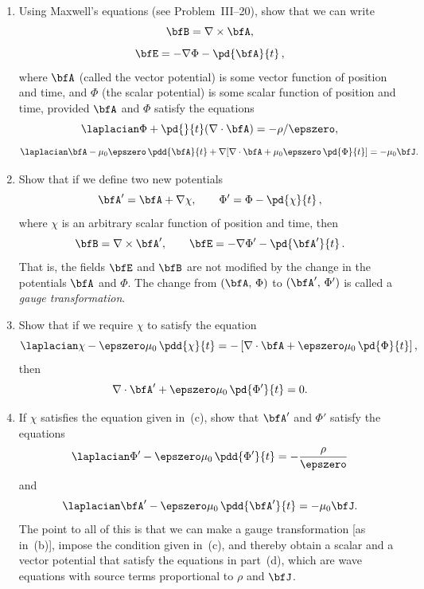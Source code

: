 \begin{problems}
\prob
\begin{enumerate}[label=(\alph*)]
\item Using Maxwell's equations (see Problem~III--20), show that we
  can write
  \[
  \bfB = \nabla\times\bfA,
  \]
  \[
  \bfE = -\nabla\Phi - \pd{\bfA}{t}\,,
  \]
  where $\bfA$ (called the vector potential) is some vector function of
  position and time, and $\Phi$ (the scalar potential) is some scalar
  function of position and time, provided $\bfA$ and $\Phi$ satisfy
  the equations
  \[
  \laplacian\Phi + \pd{}{t}(\nabla\cdot\bfA)
  = -\rho/\epszero,
  \]
  \[
  \laplacian\bfA - \mu_0\epszero\,\pdd{\bfA}{t}
  + \nabla\!\left[\nabla\cdot\bfA
    + \mu_0\epszero\,\pd{\Phi}{t}\right]
  = -\mu_0\bfJ.
  \]

\item Show that if we define two new potentials
  \[
  \bfA' = \bfA + \nabla\chi,\qquad
  \Phi' = \Phi - \pd{\chi}{t}\,,
  \]
  where $\chi$ is an arbitrary scalar function of position and time,
  then
  \[
  \bfB = \nabla\times\bfA',\qquad
  \bfE = -\nabla\Phi' - \pd{\bfA'}{t}\,.
  \]
  That is, the fields $\bfE$ and $\bfB$ are not modified by the change
  in the potentials $\bfA$ and $\Phi$.  The change from
  $(\bfA,\,\Phi)$ to $(\bfA',\,\Phi')$ is called a \emph{gauge
  transformation}.

\item Show that if we require $\chi$ to satisfy the equation
  \[
  \laplacian\chi - \epszero\mu_0\,\pdd{\chi}{t}
  = -\left[\nabla\cdot\bfA
    + \epszero\mu_0\,\pd{\Phi}{t}\right],
  \]
  then
  \[
  \nabla\cdot\bfA' + \epszero\mu_0\,\pd{\Phi'}{t} = 0.
  \]

\item If $\chi$ satisfies the equation given in~(c), show that $\bfA'$
  and $\Phi'$ satisfy the equations
  \[
  \laplacian\Phi' - \epszero\mu_0\,\pdd{\Phi'}{t}
  = -\frac{\rho}{\epszero}
  \]
  and
  \[
  \laplacian\bfA' - \epszero\mu_0\,\pdd{\bfA'}{t}
  = -\mu_0\bfJ.
  \]
  The point to all of this is that we can make a gauge transformation
  [as in~(b)], impose the condition given in~(c), and thereby obtain a
  scalar and a vector potential that satisfy the equations in part~(d),
  which are wave equations with source terms proportional to $\rho$
  and $\bfJ$.
\end{enumerate}


\end{problems}
